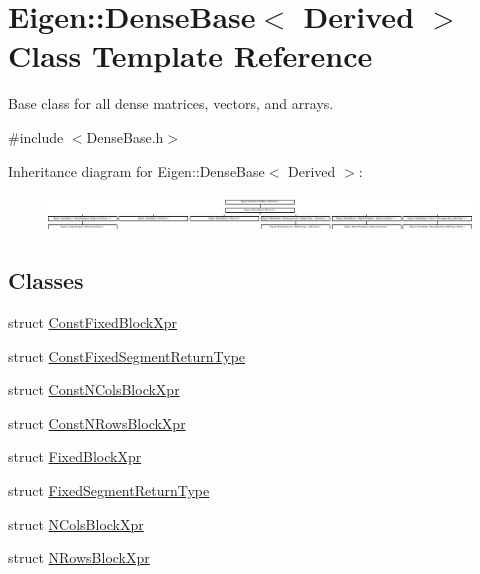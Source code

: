 \hypertarget{class_eigen_1_1_dense_base}{}\section{Eigen\+::Dense\+Base$<$ Derived $>$ Class Template Reference}
\label{class_eigen_1_1_dense_base}


Base class for all dense matrices, vectors, and arrays.  




{\ttfamily \#include $<$Dense\+Base.\+h$>$}

Inheritance diagram for Eigen\+::Dense\+Base$<$ Derived $>$\+:\begin{figure}[H]
\begin{center}
\leavevmode
\includegraphics[height=0.985048cm]{class_eigen_1_1_dense_base}
\end{center}
\end{figure}
\subsection*{Classes}
\begin{DoxyCompactItemize}
\item 
struct \mbox{\hyperlink{struct_eigen_1_1_dense_base_1_1_const_fixed_block_xpr}{Const\+Fixed\+Block\+Xpr}}
\item 
struct \mbox{\hyperlink{struct_eigen_1_1_dense_base_1_1_const_fixed_segment_return_type}{Const\+Fixed\+Segment\+Return\+Type}}
\item 
struct \mbox{\hyperlink{struct_eigen_1_1_dense_base_1_1_const_n_cols_block_xpr}{Const\+N\+Cols\+Block\+Xpr}}
\item 
struct \mbox{\hyperlink{struct_eigen_1_1_dense_base_1_1_const_n_rows_block_xpr}{Const\+N\+Rows\+Block\+Xpr}}
\item 
struct \mbox{\hyperlink{struct_eigen_1_1_dense_base_1_1_fixed_block_xpr}{Fixed\+Block\+Xpr}}
\item 
struct \mbox{\hyperlink{struct_eigen_1_1_dense_base_1_1_fixed_segment_return_type}{Fixed\+Segment\+Return\+Type}}
\item 
struct \mbox{\hyperlink{struct_eigen_1_1_dense_base_1_1_n_cols_block_xpr}{N\+Cols\+Block\+Xpr}}
\item 
struct \mbox{\hyperlink{struct_eigen_1_1_dense_base_1_1_n_rows_block_xpr}{N\+Rows\+Block\+Xpr}}
\end{DoxyCompactItemize}
